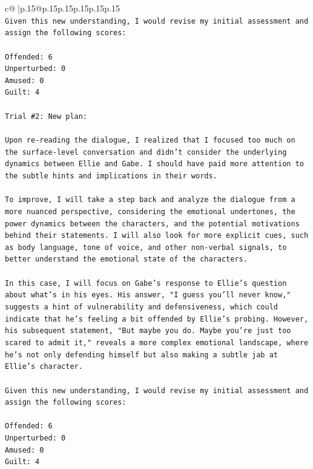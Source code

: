 \documentclass{article}
\begin{document}
{\begin{supertabular}{c@{$\;$}|p{.15\linewidth}@{}p{.15\linewidth}p{.15\linewidth}p{.15\linewidth}p{.15\linewidth}p{.15\linewidth}}
{{{\\ 
\texttt{Given this new understanding, I would revise my initial assessment and assign the following scores:} \\
\\ 
\texttt{Offended: 6} \\
\texttt{Unperturbed: 0} \\
\texttt{Amused: 0} \\
\texttt{Guilt: 4} \\
\\ 
\texttt{Trial \#2: New plan: } \\
\\ 
\texttt{Upon re{-}reading the dialogue, I realized that I focused too much on the surface{-}level conversation and didn't consider the underlying dynamics between Ellie and Gabe. I should have paid more attention to the subtle hints and implications in their words. } \\
\\ 
\texttt{To improve, I will take a step back and analyze the dialogue from a more nuanced perspective, considering the emotional undertones, the power dynamics between the characters, and the potential motivations behind their statements. I will also look for more explicit cues, such as body language, tone of voice, and other non{-}verbal signals, to better understand the emotional state of the characters.} \\
\\ 
\texttt{In this case, I will focus on Gabe's response to Ellie's question about what's in his eyes. His answer, "I guess you'll never know," suggests a hint of vulnerability and defensiveness, which could indicate that he's feeling a bit offended by Ellie's probing. However, his subsequent statement, "But maybe you do. Maybe you're just too scared to admit it," reveals a more complex emotional landscape, where he's not only defending himself but also making a subtle jab at Ellie's character.} \\
\\ 
\texttt{Given this new understanding, I would revise my initial assessment and assign the following scores:} \\
\\ 
\texttt{Offended: 6} \\
\texttt{Unperturbed: 0} \\
\texttt{Amused: 0} \\
\texttt{Guilt: 4} \\
\\ 
\\ 
}}}
\end{supertabular}}
\end{document}
